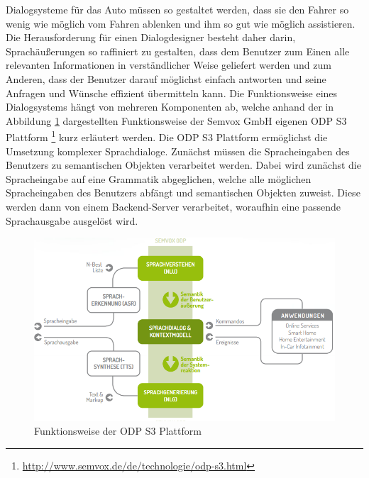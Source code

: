 \documentclass[12pt,a4paper]{scrartcl}
\begin{document}
Dialogsysteme für das Auto müssen so gestaltet werden, dass sie den Fahrer so wenig wie möglich vom Fahren ablenken und ihm so gut wie möglich assistieren. Die Herausforderung für einen Dialogdesigner besteht daher darin, Sprachäußerungen so raffiniert zu gestalten, dass dem Benutzer zum Einen alle relevanten Informationen in verständlicher Weise geliefert werden und zum Anderen, dass der Benutzer darauf möglichst einfach antworten und seine Anfragen und Wünsche effizient übermitteln kann. Die Funktionsweise eines Dialogsystems hängt von mehreren Komponenten ab, welche anhand der in Abbildung \ref{odps3} dargestellten Funktionsweise der Semvox GmbH eigenen ODP S3 Plattform \footnote{\label{foot:odps3}\url{http://www.semvox.de/de/technologie/odp-s3.html}} kurz erläutert werden. Die ODP S3 Plattform ermöglichst die Umsetzung komplexer Sprachdialoge.  
Zunächst müssen die Spracheingaben des Benutzers zu semantischen Objekten verarbeitet werden. Dabei wird zunächst die Spracheingabe auf eine Grammatik abgeglichen, welche alle möglichen Spracheingaben des Benutzers abfängt und semantischen Objekten zuweist. Diese werden dann von einem Backend-Server verarbeitet, woraufhin eine passende Sprachausgabe ausgelöst wird. 
\begin{figure}[htbp]
\begin{center}
\includegraphics[width=12cm]{odps3.png}
\caption{Funktionsweise der ODP S3 Plattform}
\label{odps3}
\end{center}
\end{figure}
\newline
\newline
\end{document}
